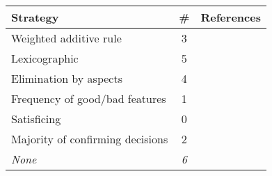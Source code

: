 
\begin{supertabular}[c]{lcp{9.5em}}
\toprule
Strategy & \# & References\tabularnewline
\midrule
Weighted additive rule       & 3 & \citep{Amirkhanov:2010,Bergner:2013,Brecheisen:2009}\tabularnewline
Lexicographic & 5 & \citep{Afzal:2011,Berger:2011,Luboschik:2014,Marks:1997,Torsney-Weir:2011}\tabularnewline
Elimination by aspects & 4 & \citep{Booshehrian:2012,Matkovic:2009,Spence:1995,Waser:2010}\tabularnewline
Frequency of good/bad features & 1 & \citep{Coffey:2013}\tabularnewline
Satisficing & 0 & \tabularnewline
Majority of confirming decisions & 2 & \citep{Bruckner:2010,Pretorius:2011}\tabularnewline
\textit{None} & \textit{6} & \textit{\citep{Guo:2009,Konyha:2006,Matkovic:2008,Piringer:2010,Potter:2009,Unger:2012}}\tabularnewline
\bottomrule
\end{supertabular}
\vspace{-5mm}
